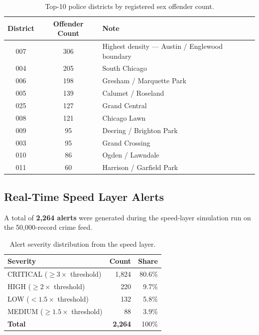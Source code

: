 \documentclass[11pt,a4paper]{article}
\begin{document}
\begin{table}[H]
\centering
\caption{Top-10 police districts by registered sex offender count.}
\label{tab:offender}
\begin{tabular}{@{}ccl@{}}
\toprule
\textbf{District} & \textbf{Offender Count} & \textbf{Note} \\
\midrule
007 & 306 & Highest density — Austin / Englewood boundary \\
004 & 205 & South Chicago \\
006 & 198 & Gresham / Marquette Park \\
005 & 139 & Calumet / Roseland \\
025 & 127 & Grand Central \\
008 & 121 & Chicago Lawn \\
009 &  95 & Deering / Brighton Park \\
003 &  95 & Grand Crossing \\
010 &  86 & Ogden / Lawndale \\
011 &  60 & Harrison / Garfield Park \\
\bottomrule
\end{tabular}
\end{table}

\subsection{Real-Time Speed Layer Alerts}

A total of \textbf{2{,}264 alerts} were generated during the speed-layer
simulation run on the 50{,}000-record crime feed.

\begin{table}[H]
\centering
\caption{Alert severity distribution from the speed layer.}
\label{tab:alerts}
\begin{tabular}{@{}lrr@{}}
\toprule
\textbf{Severity} & \textbf{Count} & \textbf{Share} \\
\midrule
CRITICAL ($\geq 3\times$ threshold) & 1{,}824 & 80.6\% \\
HIGH ($\geq 2\times$ threshold)     &   220 &  9.7\% \\
LOW ($< 1.5\times$ threshold)       &   132 &  5.8\% \\
MEDIUM ($\geq 1.5\times$ threshold) &    88 &  3.9\% \\
\midrule
\textbf{Total}                      & \textbf{2{,}264} & 100\% \\
\bottomrule
\end{tabular}
\end{table}
\end{document}
